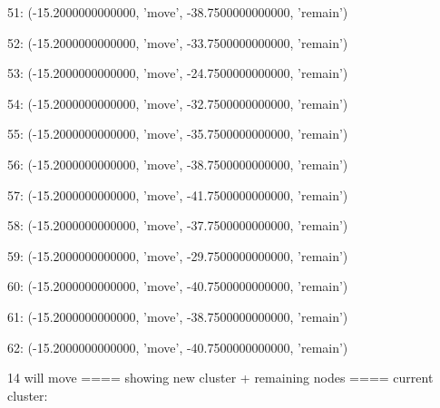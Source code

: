 51: (-15.2000000000000, 'move', -38.7500000000000, 'remain')


52: (-15.2000000000000, 'move', -33.7500000000000, 'remain')


53: (-15.2000000000000, 'move', -24.7500000000000, 'remain')


54: (-15.2000000000000, 'move', -32.7500000000000, 'remain')


55: (-15.2000000000000, 'move', -35.7500000000000, 'remain')


56: (-15.2000000000000, 'move', -38.7500000000000, 'remain')


57: (-15.2000000000000, 'move', -41.7500000000000, 'remain')


58: (-15.2000000000000, 'move', -37.7500000000000, 'remain')


59: (-15.2000000000000, 'move', -29.7500000000000, 'remain')


60: (-15.2000000000000, 'move', -40.7500000000000, 'remain')


61: (-15.2000000000000, 'move', -38.7500000000000, 'remain')


62: (-15.2000000000000, 'move', -40.7500000000000, 'remain')


14 will move
==== showing new cluster + remaining nodes ====
current cluster:


